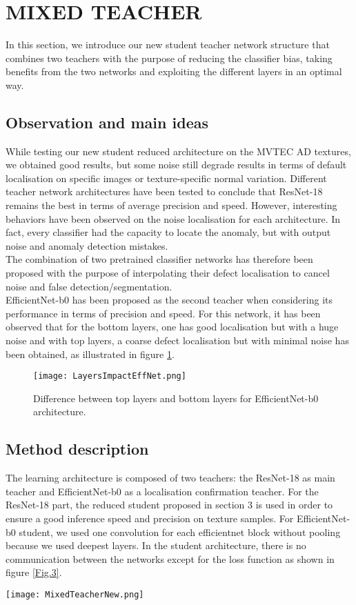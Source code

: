 \documentclass[a4paper,twoside]{article}
\begin{document}
\section{MIXED TEACHER}
In this section, we introduce our new student teacher network structure that combines two teachers with the purpose of reducing the classifier bias, taking benefits from the two networks and exploiting the different layers in an optimal way.

\subsection{Observation and main ideas}
While testing our new student reduced architecture on the MVTEC AD textures, we obtained good results, but some noise still degrade results in terms of default localisation on specific images or texture-specific normal variation. Different teacher network architectures have been tested to conclude that ResNet-18 remains the best in terms of average precision and speed. However,  interesting behaviors have been observed on the noise localisation for each architecture. In fact, every classifier had the capacity to locate the anomaly, but with output noise and anomaly detection mistakes. \\
The combination of two pretrained classifier networks has therefore been proposed with the purpose of interpolating their defect localisation to cancel noise and false detection/segmentation. \\
EfficientNet-b0 has been proposed as the second teacher when considering its performance in terms of precision and speed. For this network, it has been observed that for the bottom layers, one has good localisation but with a huge noise and with top layers, a coarse defect localisation but with minimal noise has been obtained, as illustrated in figure \ref{Fig.2}.
\begin{figure}[h]
\centerline{\texttt{[image: LayersImpactEffNet.png]}}
\renewcommand{\arraystretch}{1}
\captionsetup{justification=centering}
\caption{ 
Difference between top layers and bottom layers for EfficientNet-b0 architecture.}
\label{Fig.2}
\end{figure}

\subsection{Method description}
The learning architecture is composed of two teachers: the ResNet-18 as main teacher and EfficientNet-b0 as a localisation confirmation teacher. For the ResNet-18 part, the reduced student proposed in section 3 is used in order to ensure a good inference speed and precision on texture samples. For EfficientNet-b0 student, we used one convolution for each efficientnet block without pooling because we used deepest layers. In the student architecture, there is no communication between the networks except for the loss function as shown in figure \ref{Fig.3}.
\begin{figure*}[h]
\centerline{\texttt{[image: MixedTeacherNew.png]}}
\renewcommand{\arraystretch}{1}
\caption{ 
MixedTeacher architecture. }
\label{Fig.3}
\end{figure*}
\end{document}
